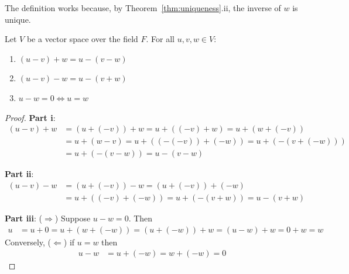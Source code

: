 \begin{note}
    The definition works because, by Theorem~\ref{thm:uniqueness}.ii, the inverse of $w$ is unique.
\end{note}

\begin{theorem}\label{thm:subtraction}
    Let $V$ be a vector space over the field $F$. For all $u, v, w \in V$:
    \begin{enumerate}[label=\roman*.]
        \item $(u - v) + w = u - (v - w)$
        \item $(u - v) - w = u - (v + w)$
        \item $u - w = 0 \iff u = w$
    \end{enumerate}
\end{theorem}

\begin{proof}
    \textbf{Part i}:
    \begin{align*}
        (u-v)+w &= (u+(-v))+w = u+((-v)+w) = u+(w+(-v)) \\
        &= u+(w-v) = u+((-(-v))+(-w)) = u+(-(v+(-w))) \\
        &= u+(-(v-w)) = u-(v-w)
    \end{align*}

    \textbf{Part ii}:
    \begin{align*}
        (u-v)-w &= (u+(-v))-w = (u+(-v))+(-w) \\
        &= u+((-v)+(-w)) = u+(-(v+w)) = u-(v+w)
    \end{align*}

    \textbf{Part iii}: ($\Rightarrow$) Suppose $u-w=0$. Then
    \begin{align*}
        u &= u+0 = u+(w+(-w)) = (u+(-w))+w = (u-w)+w = 0+w = w
    \end{align*}
    Conversely, ($\Leftarrow$) if $u=w$ then
    \begin{align*}
        u-w &= u+(-w) = w+(-w) = 0
    \end{align*}
\end{proof}